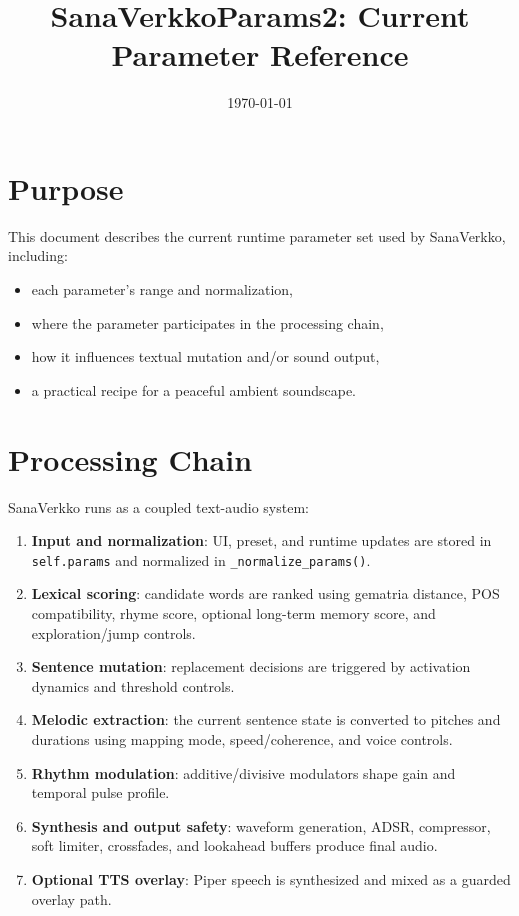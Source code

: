\documentclass[11pt,a4paper]{article}
\title{SanaVerkkoParams2: Current Parameter Reference}
\author{}
\date{\today}
\begin{document}
\maketitle

\section{Purpose}
This document describes the current runtime parameter set used by SanaVerkko, including:
\begin{itemize}
  \item each parameter's range and normalization,
  \item where the parameter participates in the processing chain,
  \item how it influences textual mutation and/or sound output,
  \item a practical recipe for a peaceful ambient soundscape.
\end{itemize}

\section{Processing Chain}
SanaVerkko runs as a coupled text-audio system:
\begin{enumerate}
  \item \textbf{Input and normalization}: UI, preset, and runtime updates are stored in \texttt{self.params} and normalized in \texttt{\_normalize\_params()}.
  \item \textbf{Lexical scoring}: candidate words are ranked using gematria distance, POS compatibility, rhyme score, optional long-term memory score, and exploration/jump controls.
  \item \textbf{Sentence mutation}: replacement decisions are triggered by activation dynamics and threshold controls.
  \item \textbf{Melodic extraction}: the current sentence state is converted to pitches and durations using mapping mode, speed/coherence, and voice controls.
  \item \textbf{Rhythm modulation}: additive/divisive modulators shape gain and temporal pulse profile.
  \item \textbf{Synthesis and output safety}: waveform generation, ADSR, compressor, soft limiter, crossfades, and lookahead buffers produce final audio.
  \item \textbf{Optional TTS overlay}: Piper speech is synthesized and mixed as a guarded overlay path.
\end{enumerate}
\end{document}
